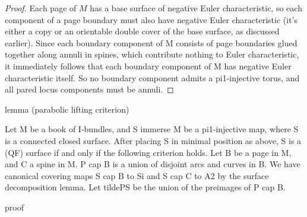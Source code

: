 \begin{proof}

Each page of $M$ has a base surface of negative Euler characteristic, so each
component of a page boundary must also have negative Euler characteristic (it's
either a copy or an orientable double cover of the base surface, as discussed
earlier). Since each boundary component of M consists of page boundaries glued
together along annuli in spines, which contribute nothing to Euler
characteristic, it immediately follows that each boundary component of M has
negative Euler characteristic itself. So no boundary component admits
a pi1-injective torus, and all pared locus components must be annuli.

\end{proof}


lemma (parabolic lifting criterion)

Let M be a book of I-bundles, and S immerse M be a pi1-injective map, where
S is a connected closed surface.  After placing S in minimal position as above,
S is a (QF) surface if and only if the following criterion holds. Let B be
a page in M, and C a spine in M. P cap B is a union of disjoint arcs and curves
in B. We have canonical covering maps S cap B to Si and S cap C to A2 by the
surface decomposition lemma. Let tildePS be the union of the preimages of P cap
B. %

proof


